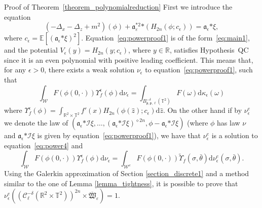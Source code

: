 \documentclass[a4paper,10pt]{article}
\newcommand{\asterisk}{\mathord{*}}
\newcommand{\mathd}{\mathrm{d}}
\newenvironment{proof*}[1]{\noindent\textbf{#1\ }}{\hspace*{\fill}$\Box$\medskip}
\begin{document}
\begin{proof*}{Proof of Theorem~\ref{theorem_polynomialreduction}}
  First we introduce the equation
  \begin{equation}
    (- \Delta_x - \Delta_z + m^2) (\phi) +
    \mathfrak{a}_{\varepsilon}^{\asterisk 2} \asterisk (H_{2 n} (\phi ;
    c_{\epsilon})) = \mathfrak{a}_{\epsilon} \asterisk \xi
    \label{eq:powerproof1},
  \end{equation}
  where $c_{\epsilon} =\mathbb{E} [(\mathfrak{a}_{\epsilon} \asterisk
  \xi)^2]$. Equation~{\eqref{eq:powerproof1}} is of the
  form~{\eqref{eq:main1}}, and the potential $V_{\epsilon} (y) = H_{2 n} (y ;
  c_{\epsilon})$, where $y \in \mathbb{R}$, satisfies Hypothesis~QC since it
  is an even polynomial with positive leading coefficient. This means that,
  for any $\epsilon > 0$, there exists a weak solution $\nu_{\epsilon}$ to
  equation~{\eqref{eq:powerproof1}}, such that
  \[ \int_{\mathcal{W}} F (\phi (0, \cdot)) \Upsilon_f^{\epsilon} (\phi)
     \mathd \nu_{\epsilon} = \int_{B^{- \delta}_{\mathfrak{p}, \mathfrak{p},
     \ell} (\mathbb{T}^2)} F (\omega) \mathd \kappa_{\epsilon} (\omega) \]
  where $\Upsilon_f^{\epsilon} (\phi) = \int_{\mathbb{R}^2 \times
  \mathbb{T}^2} f' (x) H_{2 n} (\phi (\hat{z}) ; c_{\epsilon}) \mathd
  \hat{z}$. On the other hand if by $\nu^e_{\epsilon}$ we denote the law of
  $(\mathcal{\mathfrak{a}}_{\epsilon} \asterisk \mathcal{I} \xi, \ldots,
  (\mathcal{\mathfrak{a}}_{\epsilon} \asterisk \mathcal{I} \xi)^{\diamond 2
  n}, \phi - \mathcal{\mathfrak{a}}_{\epsilon} \asterisk \mathcal{I} \xi)$
  (where $\phi$ has law $\nu$ and $\mathcal{\mathfrak{a}}_{\epsilon} \asterisk
  \mathcal{I} \xi$ is given by equation~{\eqref{eq:powerproof1}}), we have
  that $\nu^e_{\epsilon}$ is a solution to equation~{\eqref{eq:power4}} and
  \[ \int_{\mathcal{W}} F (\phi (0, \cdot)) \Upsilon_f^{\epsilon} (\phi)
     \mathd \nu_{\epsilon} = \int_{\mathcal{W}^e} F (\phi (0, \cdot))
     \tilde{\Upsilon}_f (\sigma, \bar{\theta}) \mathd \nu^e_{\epsilon}
     (\sigma, \bar{\theta}) . \]
  Using the Galerkin approximation of Section \ref{section_discrete1} and a
  method similar to the one of Lemma \ref{lemma_tightness}, it is possible to
  prove that $\nu^e_{\epsilon} ((\mathcal{C}^{- \delta}_{\ell} (\mathbb{R}^2
  \times \mathbb{T}^2))^{2 n} \times \overline{\mathfrak{W}}_{\varepsilon}) =
  1$.
  

\end{proof*}
\end{document}
